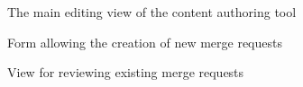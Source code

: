 



\begin{figure}[hp!]
 \centering
 \caption{The main editing view of the content authoring tool}
 \label{fig:main-editing-view}
\end{figure}

\begin{figure}[hp!]
 \centering
 \caption{Form allowing the creation of new merge requests}
\end{figure}


\begin{figure}[hp!]
 \centering
 \caption{View for reviewing existing merge requests}
\end{figure}
